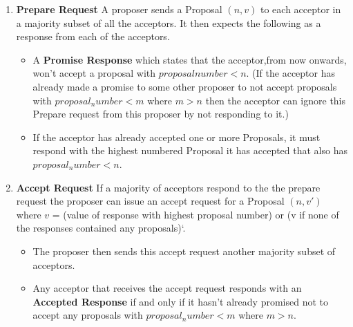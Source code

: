 \begin{enumerate}
  \item \textbf{Prepare Request} A proposer sends a Proposal $(n, v)$ to each acceptor in
    a majority subset of all the acceptors. It then expects the following as a
    response from each of the acceptors.
    \begin{itemize}
      \item A \textbf{Promise Response} which states that the acceptor,from now onwards,
        won't accept a proposal with $proposal number < n$. (If the acceptor has
        already made a promise to some other proposer to not accept proposals with
        $proposal_number < m$ where $m > n$ then the acceptor can ignore this
        Prepare request from this proposer by not responding to it.)
      \item If the acceptor has already accepted one or more Proposals, it must
        respond with the highest numbered Proposal it has accepted that also has
        $proposal_number < n$.
    \end{itemize}
  \item \textbf{Accept Request} If a majority of acceptors respond to the the prepare request
    the proposer can issue an accept request for a Proposal $(n, v')$ where
    $v$ = (value of response with highest proposal number) or
    (v if none of the responses contained any proposals)`.
    \begin{itemize}
      \item The proposer then sends this accept request another majority
        subset of acceptors.
      \item Any acceptor that receives the accept request responds with an
        \textbf{Accepted Response} if and only if it hasn't already promised not to
        accept any proposals with $proposal_number < m$ where $m > n$.
    \end{itemize}
\end{enumerate}



